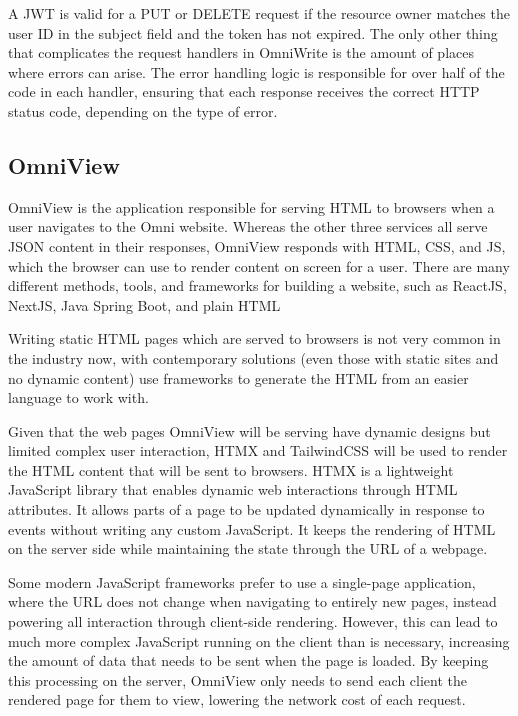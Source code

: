A JWT is valid for a PUT or DELETE request if the resource owner matches the user ID in the subject field and the token has not expired.
The only other thing that complicates the request handlers in OmniWrite is the amount of places where errors can arise. 
The error handling logic is responsible for over half of the code in each handler, ensuring that each response receives the correct HTTP status code, depending on the type of error.

\subsection{OmniView}
OmniView is the application responsible for serving HTML to browsers when a user navigates to the Omni website.
Whereas the other three services all serve JSON content in their responses, OmniView responds with HTML, CSS, and JS, which the browser can use to render content on screen for a user.
There are many different methods, tools, and frameworks for building a website, such as ReactJS, NextJS, Java Spring Boot, and plain HTML \citep{StackOverflow2024}

Writing static HTML pages which are served to browsers is not very common in the industry now, with contemporary solutions (even those with static sites and no dynamic content) use frameworks to generate the HTML from an easier language to work with. 

Given that the web pages OmniView will be serving have dynamic designs but limited complex user interaction, HTMX and TailwindCSS will be used to render the HTML content that will be sent to browsers.
HTMX is a lightweight JavaScript library that enables dynamic web interactions through HTML attributes.
It allows parts of a page to be updated dynamically in response to events without writing any custom JavaScript. It keeps the rendering of HTML on the server side while maintaining the state through the URL of a webpage. 

Some modern JavaScript frameworks prefer to use a single-page application, where the URL does not change when navigating to entirely new pages, instead powering all interaction through client-side rendering.
However, this can lead to much more complex JavaScript running on the client than is necessary, increasing the amount of data that needs to be sent when the page is loaded.
By keeping this processing on the server, OmniView only needs to send each client the rendered page for them to view, lowering the network cost of each request. 

